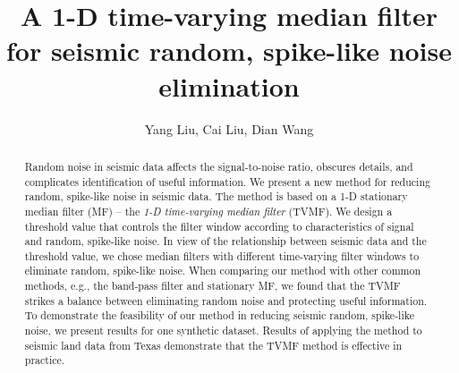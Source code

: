 \title{A 1-D time-varying median filter for seismic random, spike-like noise elimination}

\renewcommand{\thefootnote}{\fnsymbol{footnote}}


\address{
\footnotemark[1] College of Geo-exploration Science and Technology,\\
Jilin University \\
No.6 Xi minzhu street, \\
Changchun, China, 130026 \\
\footnotemark[2] Bureau of Economic Geology,\\
John A. and Katherine G. Jackson School of Geosciences \\
The University of Texas at Austin \\
University Station, Box X \\
Austin, TX, USA, 78713-8924}

\author{Yang Liu\footnotemark[1]\footnotemark[2], Cai Liu\footnotemark[1], Dian Wang\footnotemark[1]}

\maketitle

\begin{abstract}

Random noise in seismic data affects the signal-to-noise ratio, 
obscures details, and complicates identification of useful information. We 
present a new method for reducing random, spike-like noise in seismic data. 
The method is based on a 1-D stationary median filter (MF) -- the \emph{1-D 
time-varying median filter} (TVMF). We design a threshold value that 
controls the filter window according to characteristics of signal and 
random, spike-like noise. In view of the relationship between seismic data 
and the threshold value, we chose median filters with different time-varying 
filter windows to eliminate random, spike-like noise. When comparing our 
method with other common methods, e.g., the band-pass filter 
and stationary MF, we found that 
the TVMF strikes a balance between eliminating random noise and protecting 
useful information. To demonstrate the feasibility of our method in reducing 
seismic random, spike-like noise, we present results for one synthetic dataset. 
Results of applying the method to seismic land data from Texas 
demonstrate that the TVMF method is effective in practice. 

\end{abstract}

